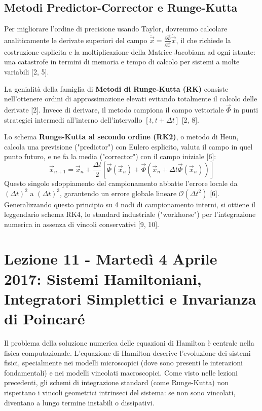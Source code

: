\documentclass[12pt,a4paper]{article}
\begin{document}
\subsection{Metodi Predictor-Corrector e Runge-Kutta}
Per migliorare l'ordine di precisione usando Taylor, dovremmo calcolare analiticamente le derivate superiori del campo $\ddot{\vec{x}} = \frac{\partial \vec{\Phi}}{\partial \vec{x}} \dot{\vec{x}}$, il che richiede la costruzione esplicita e la moltiplicazione della Matrice Jacobiana ad ogni istante: una catastrofe in termini di memoria e tempo di calcolo per sistemi a molte variabili [2, 5].

La genialità della famiglia di \textbf{Metodi di Runge-Kutta (RK)} consiste nell'ottenere ordini di approssimazione elevati evitando totalmente il calcolo delle derivate [2]. Invece di derivare, il metodo campiona il campo vettoriale $\vec{\Phi}$ in punti strategici intermedi all'interno dell'intervallo $[t, t+\Delta t]$ [2, 8].

Lo schema \textbf{Runge-Kutta al secondo ordine (RK2)}, o metodo di Heun, calcola una previsione ("predictor") con Eulero esplicito, valuta il campo in quel punto futuro, e ne fa la media ("corrector") con il campo iniziale [6]:
\begin{equation}
\vec{x}_{n+1} = \vec{x}_n + \frac{\Delta t}{2} \left[ \vec{\Phi}(\vec{x}_n) + \vec{\Phi}(\vec{x}_n + \Delta t \vec{\Phi}(\vec{x}_n)) \right]
\end{equation}
Questo singolo sdoppiamento del campionamento abbatte l'errore locale da $(\Delta t)^2$ a $(\Delta t)^3$, garantendo un errore globale lineare $\mathcal{O}(\Delta t^2)$ [6]. Generalizzando questo principio su 4 nodi di campionamento interni, si ottiene il leggendario schema RK4, lo standard industriale ("workhorse") per l'integrazione numerica in assenza di vincoli conservativi [9, 10].

\newpage

\section{Lezione 11 - Martedì 4 Aprile 2017: Sistemi Hamiltoniani, Integratori Simplettici e Invarianza di Poincaré}

Il problema della soluzione numerica delle equazioni di Hamilton è centrale nella fisica computazionale. L'equazione di Hamilton descrive l'evoluzione dei sistemi fisici, specialmente nei modelli microscopici (dove sono presenti le interazioni fondamentali) e nei modelli vincolati macroscopici. 
Come visto nelle lezioni precedenti, gli schemi di integrazione standard (come Runge-Kutta) non rispettano i vincoli geometrici intrinseci del sistema: se non sono vincolati, diventano a lungo termine instabili o dissipativi.
\end{document}
